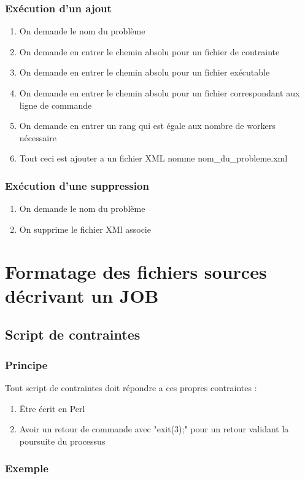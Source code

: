 \documentclass[11pt]{report}
\begin{document}
\subsection{Exécution d'un ajout}
\begin{enumerate}
\item On demande le nom du problème 
\item On demande en entrer le chemin absolu pour un fichier de contrainte
\item On demande en entrer le chemin absolu pour un fichier exécutable
\item On demande en entrer le chemin absolu pour un fichier correspondant aux ligne de commande
\item On demande en entrer un rang qui est égale aux nombre de workers nécessaire 
\item Tout ceci est ajouter a un fichier XML nomme nom\_du\_probleme.xml
\end{enumerate}

\newpage\subsection{Exécution d'une suppression}
\begin{enumerate}
\item On demande le nom du problème 
\item On supprime le fichier XMl associe 
\end{enumerate}

\chapter{Formatage des fichiers sources décrivant un JOB}
\section{Script de contraintes}
\subsection{Principe}
Tout script de contraintes doit répondre a ces propres contraintes :
\begin{enumerate}
\item Être écrit en Perl
\item Avoir un retour de commande avec "exit(3);" pour un retour validant la poursuite du processus 

\end{enumerate}
\subsection{Exemple}
\end{document}
